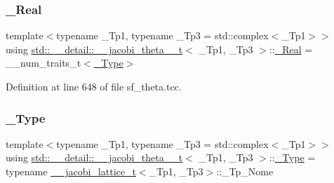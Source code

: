\mbox{\label{structstd_1_1____detail_1_1____jacobi__theta__0__t_a1828d0b82b76cdf8281b0eabcfcfbaf9}} 
\subsubsection{\texorpdfstring{\+\_\+\+Real}{\_Real}}
{\footnotesize\ttfamily template$<$typename \+\_\+\+Tp1, typename \+\_\+\+Tp3 = std\+::complex$<$\+\_\+\+Tp1$>$$>$ \\
using \hyperlink{structstd_1_1____detail_1_1____jacobi__theta__0__t}{std\+::\+\_\+\+\_\+detail\+::\+\_\+\+\_\+jacobi\+\_\+theta\+\_\+\_\+t}$<$ \+\_\+\+Tp1, \+\_\+\+Tp3 $>$\+::\hyperlink{structstd_1_1____detail_1_1____jacobi__theta__0__t_a1828d0b82b76cdf8281b0eabcfcfbaf9}{\+\_\+\+Real} =  \+\_\+\+\_\+num\+\_\+traits\+\_\+t$<$\hyperlink{structstd_1_1____detail_1_1____jacobi__theta__0__t_a4aebcbdd8f3ab416a2fa770aa3784d63}{\+\_\+\+Type}$>$}



Definition at line 648 of file sf\+\_\+theta.\+tcc.

\mbox{\label{structstd_1_1____detail_1_1____jacobi__theta__0__t_a4aebcbdd8f3ab416a2fa770aa3784d63}} 
\subsubsection{\texorpdfstring{\+\_\+\+Type}{\_Type}}
{\footnotesize\ttfamily template$<$typename \+\_\+\+Tp1, typename \+\_\+\+Tp3 = std\+::complex$<$\+\_\+\+Tp1$>$$>$ \\
using \hyperlink{structstd_1_1____detail_1_1____jacobi__theta__0__t}{std\+::\+\_\+\+\_\+detail\+::\+\_\+\+\_\+jacobi\+\_\+theta\+\_\+\_\+t}$<$ \+\_\+\+Tp1, \+\_\+\+Tp3 $>$\+::\hyperlink{structstd_1_1____detail_1_1____jacobi__theta__0__t_a4aebcbdd8f3ab416a2fa770aa3784d63}{\+\_\+\+Type} =  typename \hyperlink{structstd_1_1____detail_1_1____jacobi__lattice__t}{\+\_\+\+\_\+jacobi\+\_\+lattice\+\_\+t}$<$\+\_\+\+Tp1, \+\_\+\+Tp3$>$\+::\+\_\+\+Tp\+\_\+\+Nome}



